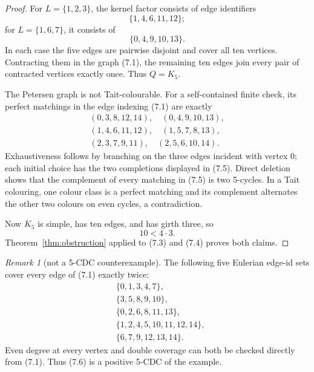 \documentclass[11pt]{article}
\theoremstyle{definition}
\theoremstyle{remark}
\newtheorem{remark}[theorem]{Remark}
\begin{document}
\begin{proof}
For \(L=\{1,2,3\}\), the kernel factor consists of edge identifiers
\[
                         \{1,4,6,11,12\};
                                                        \tag{7.3}
\]
for \(L=\{1,6,7\}\), it consists of
\[
                         \{0,4,9,10,13\}.               \tag{7.4}
\]
In each case the five edges are pairwise disjoint and cover all ten
vertices.  Contracting them in the graph (7.1), the remaining ten edges
join every pair of contracted vertices exactly once.  Thus \(Q=K_5\).

The Petersen graph is not Tait-colourable.  For a self-contained finite
check, its perfect matchings in the edge indexing (7.1) are exactly
\[
\begin{gathered}
(0,3,8,12,14),\quad (0,4,9,10,13),\\
(1,4,6,11,12),\quad (1,5,7,8,13),\\
(2,3,7,9,11),\quad (2,5,6,10,14).
                                                        \tag{7.5}
\end{gathered}
\]
Exhaustiveness follows by branching on the three edges incident with
vertex \(0\); each initial choice has the two completions displayed in
(7.5).  Direct deletion shows that the complement of every matching in
(7.5) is two 5-cycles.  In a Tait colouring, one colour class is a
perfect matching and its complement alternates the other two colours on
even cycles, a contradiction.

Now \(K_5\) is simple, has ten edges, and has girth three, so
\[
                            10<4\cdot3.
\]
Theorem~\ref{thm:obstruction} applied to (7.3) and (7.4) proves both
claims.
\end{proof}

\begin{remark}[not a 5-CDC counterexample]
The following five Eulerian edge-id sets cover every edge of (7.1)
exactly twice:
\[
\begin{aligned}
&\{0,1,3,4,7\},\\
&\{3,5,8,9,10\},\\
&\{0,2,6,8,11,13\},\\
&\{1,2,4,5,10,11,12,14\},\\
&\{6,7,9,12,13,14\}.
\end{aligned}                                           \tag{7.6}
\]
Even degree at every vertex and double coverage can both be checked
directly from (7.1).  Thus (7.6) is a positive 5-CDC of the example.
\end{remark}
\end{document}
